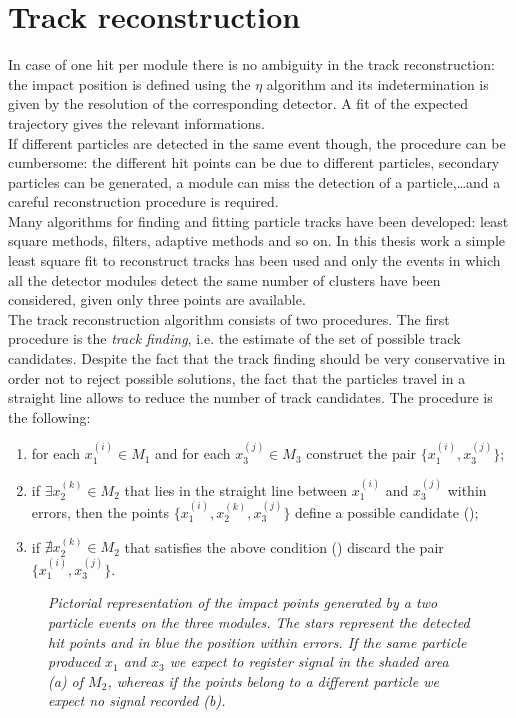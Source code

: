 \section{Track reconstruction}
In case of one hit per module there is no ambiguity in the track reconstruction:
the impact position is defined using the $\eta$ algorithm and its
indetermination is given by the resolution of the corresponding detector. A
fit of the expected trajectory gives the relevant informations.\\
If different particles are detected in the same event though, the procedure can
be cumbersome: the different hit points can be due to different particles,
secondary particles can be generated,
a module can miss the detection of a particle,\ldots and a careful reconstruction procedure is required.\\
Many algorithms for finding and fitting particle tracks have been developed:
least square methods, filters, adaptive methods and so on. In this thesis work a
simple least square fit to reconstruct tracks has been used and only the events
in which all the detector modules detect the same number of clusters have been
considered, given only three
points are available. \\
The track reconstruction algorithm consists of two procedures. The first
procedure is the {\em track finding}, i.e. the estimate of the set of possible
track candidates. Despite the fact that the track finding should be very
conservative in order not to reject possible solutions, the fact that the
particles travel in a straight line allows to reduce the number of track
candidates. The procedure is the following:
\begin{enumerate}
\item for each $x_1^{(i)}\in M_1$ and for each  $x_3^{(j)}\in M_3$ construct the
  pair $\{x_1^{(i)},x_3^{(j)}\}$;
\item if $\exists x_2^{(k)}\in M_2$ that lies in the straight line between
  $x_1^{(i)}$ and $x_3^{(j)}$ within errors, then the points $\{x_1^{(i)},x_2^{(k)},x_3^{(j)}\}$
  define a possible candidate ();
\item if $\nexists x_2^{(k)}\in M_2$ that satisfies the above condition () discard
  the pair $\{x_1^{(i)},x_3^{(j)}\}$. 
\end{enumerate}
\begin{figure}[!htbp]
  \centering 
  \subfloat[]{  \label{fig:track_candidates_ok} }\quad
  \subfloat[]{  \label{fig:track_candidates_nok} }
  \caption{\it Pictorial representation of the impact points generated by a two
    particle events on the three modules. The stars represent the detected hit
    points and in blue the position within errors. If the same particle produced
    $x_1$ and $x_3$ we expect to register signal in the shaded area (a) of
    $M_2$, whereas if the points belong to a different particle we expect no
    signal recorded (b).}
  \label{fig:track_candidates}
\end{figure} 
